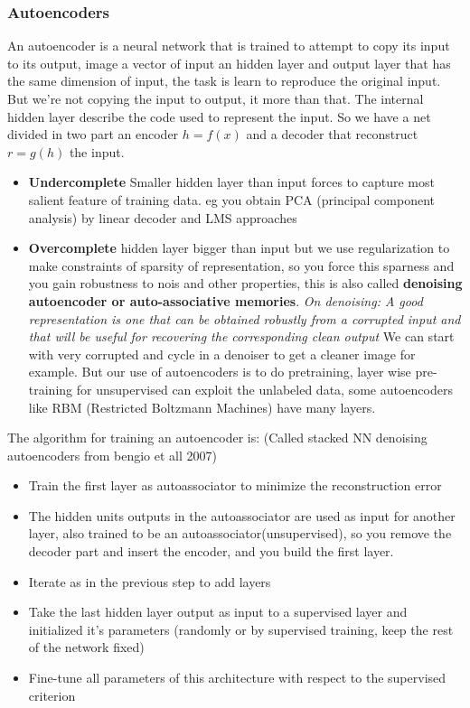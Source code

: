 \documentclass[12pt]{book}
\begin{document}
\subsubsection{Autoencoders}
An autoencoder is a neural network that is trained to attempt to copy its input to its output, image a vector of input an hidden layer and output layer that has the same dimension of input, the task is learn to reproduce the original input.\newline
But we're not copying the input to output, it more than that. The internal hidden layer describe the code used to represent the input.\newline
So we have a net divided in two part an encoder $h = f(x)$ and a decoder that reconstruct $r = g(h)$ the input.
\begin{itemize}
	\item \textbf{Undercomplete} Smaller hidden layer than input forces to capture most salient feature of training data. eg you obtain PCA (principal component analysis) by linear decoder and LMS approaches
	\item \textbf{Overcomplete} hidden layer bigger than input but we use regularization to make constraints of sparsity of representation, so you force this sparness and you gain robustness to nois and other properties, this is also called \textbf{denoising autoencoder or auto-associative memories}.\newline
	\textit{On denoising: A good representation is one that can be obtained robustly from a corrupted input and that will be useful for recovering the corresponding clean output}
	\newline We can start with very corrupted and cycle in a denoiser to get a cleaner image for example. But our use of autoencoders is to do pretraining, layer wise pre-training for unsupervised can exploit the unlabeled data, some autoencoders like RBM (Restricted Boltzmann Machines) have many layers.
\end{itemize}
The algorithm for training an autoencoder is: (Called stacked NN denoising autoencoders from bengio et all 2007)
\begin{itemize}
	\item Train the first layer as autoassociator to minimize the reconstruction error 
	\item The hidden units outputs in the autoassociator are used as input for another layer, also trained to be an autoassociator(unsupervised), so you remove the decoder part and insert the encoder, and you build the first layer.
	\item Iterate as in the previous step to add layers
	\item Take the last hidden layer output as input to a supervised layer and initialized it's parameters (randomly or by supervised training, keep the rest of the network fixed)
	\item Fine-tune all parameters of this architecture with respect to the supervised criterion
\end{itemize}
\end{document}
